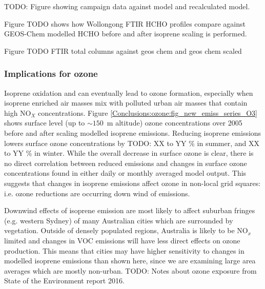       TODO: Figure showing campaign data against model and recalculated model.
      
      
      Figure TODO shows how Wollongong FTIR HCHO profiles compare against GEOS-Chem modelled HCHO before and after isoprene scaling is performed. 
      
      
      Figure TODO FTIR total columns against geos chem and geos chem scaled
  
    \subsubsection{Implications for ozone}
  
      Isoprene oxidation and can eventually lead to ozone formation, especially when isoprene enriched air masses mix with polluted urban air masses that contain high NO$_X$ concentrations.
      Figure \ref{Conclusions:ozone:fig_new_emiss_series_O3} shows surface level (up to $\sim 150$~m altitude) ozone concentrations over 2005 before and after scaling modelled isoprene emissions.
      Reducing isoprene emissions lowers surface ozone concentrations by TODO: XX to YY \% in summer, and XX to YY \% in winter.
      While the overall decrease in surface ozone is clear, there is no direct correlation between reduced emissions and changes in surface ozone concentrations found in either daily or monthly averaged model output.
      This suggests that changes in isoprene emissions affect ozone in non-local grid squares: i.e. ozone reductions are occurring down wind of emissions. 
      
      
      
      Downwind effects of isoprene emission are most likely to affect suburban fringes (e.g. western Sydney) of many Australian cities which are surrounded by vegetation.
      Outside of densely populated regions, Australia is likely to be NO$_x$ limited and changes in VOC emissions will have less direct effects on ozone production.
      This means that cities may have higher sensitivity to changes in modelled isoprene emissions than shown here, since we are examining large area averages which are mostly non-urban.
      TODO: Notes about ozone exposure from State of the Environment report 2016.
      
